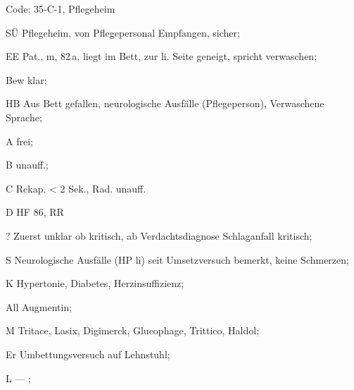 \documentclass[
ngerman,
paper=a4,
asymmetric,
fontsize=9pt,
draft=false,
parskip=half,
footnotes=multiple,
toc=flat,
]{scrbook}
\newcommand{\ExamProtTypA}[6]{
\cleardoublepage

\addsec{#1}


\begin{WidePar}
{\fontfamily{lmtt}\fontseries{lc}\selectfont#2}
\begin{multicols}{2}
\BoxRoundedBorderFilled{Beige}{Beige}{%
\sffamily\scriptsize\color{Grey}\hrule
0 \hrulefill\par

\mbox{}\hrulefill\par

1 \hrulefill\par

\mbox{}\hrulefill\par

2 \hrulefill\par

\mbox{}\hrulefill\par

3 \hrulefill\par

\mbox{}\hrulefill\par

4 \hrulefill\par

\mbox{}\hrulefill\par

5 \hrulefill\par

\mbox{}\hrulefill\par


6 \hrulefill\par

\mbox{}\hrulefill\par


7 \hrulefill\par

\mbox{}\hrulefill\par


8 \hrulefill\par

\mbox{}\hrulefill\par


9 \hrulefill\par

\mbox{}\hrulefill\par


10 \hrulefill\par

\mbox{}\hrulefill\par

11 \hrulefill\par

\mbox{}\hrulefill\par

12 \hrulefill\par

\mbox{}\hrulefill\par

13 \hrulefill\par

\mbox{}\hrulefill\par

14 \hrulefill\par

\mbox{}\hrulefill\par

15 \hrulefill\par

\mbox{}\hrulefill\par

16 \hrulefill\par

\mbox{}\hrulefill\par

17 \hrulefill\par

\mbox{}\hrulefill\par

18 \hrulefill\par

\mbox{}\hrulefill\par

19 \hrulefill\par

\mbox{}\hrulefill\par




}

\columnbreak
\sffamily\scriptsize

\paragraph{E-Block}

\begin{compactitem}
  \item Szeneüberblick
  \item[GI:]  
  \begin{inparaitem}
    \item Eindruck
    \item Bewußtsein
    \item Hauptbeschwerde
  \end{inparaitem}
  \item Atemweg
  \item B
  \item C
  \item[D:]
  \begin{inparaitem}
    \item HF
    \item RR
    \item TCh1
  \end{inparaitem}
  \item Einschätzung "`kritisch"' begründbar
\end{compactitem}

Bewertung: \colorbox{Beige}{~~~}\,/\,\colorbox{Beige}{~~~}


\paragraph{Wichtige Punkte}~\par
#3


Bewertung: \colorbox{Beige}{~~~}\,/\,\colorbox{Beige}{~~~}

\paragraph{Relevante Punkte}~\par
#4

Bewertung: \colorbox{Beige}{~~~}\,/\,\colorbox{Beige}{~~~}



\paragraph{Muss-/KO-Punkte}~\par
#6

KO: Patientengefährung

\paragraph{Bewertung Qualität} nach Globalskala

Q: \colorbox{Beige}{~~~}\,/\,5

\paragraph{Bewertung Reihenfolge} nach Globalskala

R: \colorbox{Beige}{~~~}\,/\,5 

\normalsize ~
\end{multicols}
\sffamily
\begin{tabulary}{\linewidth}{ccccccc}
\toprule
E-Block & Wi. M & Rel. M & Qualität & Reihenfolge & ~ & Summe
\\\midrule
(2x \colorbox{Beige}{~~~}\,/\,\colorbox{Beige}{~~~}~+
&
3x \colorbox{Beige}{~~~}\,/\,\colorbox{Beige}{~~~}~+ 
& 
2x \colorbox{Beige}{~~~}\,/\,\colorbox{Beige}{~~~}~+\,/\,\colorbox{Beige}{~~~}~+ 
& 
\colorbox{Beige}{~~~}\,/\,5 
& 
2x \colorbox{Beige}{~~~}\,/\,5~+ 
& 
)\,/\,9~= 
& 
\colorbox{Beige}{~~~}
\\\bottomrule
\end{tabulary}



\end{WidePar}

}
\begin{document}

{%
Code: 35-C-1, Pflegeheim

\begin{inparadesc}
  \item[SÜ] Pflegeheim, von Pflegepersonal Empfangen, sicher; 
  \item[EE] Pat., m, 82\,a, liegt im Bett, zur li. Seite geneigt, spricht verwaschen;
  \item[Bew] klar;
  \item[HB] Aus Bett gefallen, neurologische Ausfälle (Pflegeperson), Verwaschene Sprache;
  \item[A] frei; 
  \item[B] unauff.;
  \item[C] Rekap. < 2 Sek., Rad. unauff.
  \item[D] HF 86, RR 
  \item[?] Zuerst unklar ob kritisch, ab Verdachtsdiagnose Schlaganfall kritisch;
\end{inparadesc}

\begin{inparadesc}
  \item[S] Neurologische Ausfälle (HP li) seit Umsetzversuch bemerkt, keine Schmerzen;
  \item[K] Hypertonie, Diabetes, Herzinsuffizienz;
  \item[All] Augmentin;
  \item[M] Tritace, Lasix, Digimerck, Glucophage, Trittico, Haldol;
  \item[Er] Umbettungsversuch auf Lehnstuhl;
  \item[L] --- ; 
\end{inparadesc}

}
\end{document}
